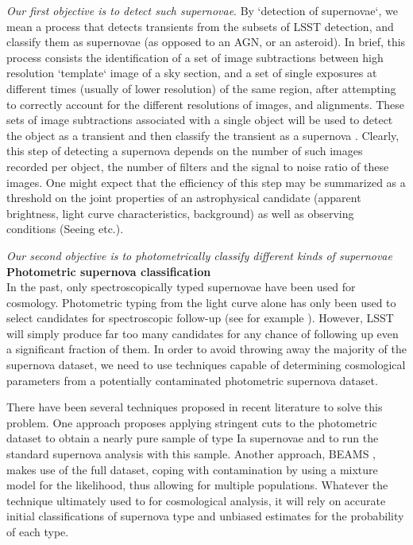 {\emph{Our first objective is to detect such supernovae}}. By `detection of supernovae`, we mean a process
that detects transients from the subsets of LSST detection, and classify them as supernovae (as opposed to an AGN, or an asteroid). In brief, this process 
consists the identification of a set of image subtractions between high 
resolution `template` image of a sky section, and a set of single exposures at
different times (usually of lower resolution) of the same region, after 
attempting to correctly account for the different resolutions of images, and alignments. These sets of image subtractions associated
 with a single object will be used to detect the object as a transient and then
classify the transient as a supernova . Clearly, this step of detecting a supernova depends on the number of such images recorded per object, the number of filters and the signal to noise ratio of these images. One might expect that the efficiency of this step may be summarized as a threshold on the joint properties 
of an astrophysical candidate (apparent brightness, light curve characteristics, background) as well as observing conditions (Seeing etc.).  

{\emph{Our second objective is to photometrically classify different kinds of supernovae}} 
{\bfseries Photometric supernova classification}\\
In the past, only spectroscopically typed supernovae have been used for cosmology. Photometric 
typing from the light curve alone has only been used to select candidates for spectroscopic 
follow-up (see for example \citet{Sako2008}). However, LSST will simply produce far too many 
candidates for any chance of following up even a significant fraction of them. In order to avoid 
throwing away the majority of the supernova dataset, we need to use techniques capable of 
determining cosmological parameters from a potentially contaminated photometric supernova dataset.

There have been several techniques proposed in recent literature to solve this problem. One 
approach proposes applying stringent cuts to the photometric dataset to obtain a nearly pure sample 
of type Ia supernovae \citep{Bernstein2012,Campbell2013} and to run the standard supernova analysis 
with this sample. Another approach, BEAMS \citep{Kunz2007,Newling2011,Hlozek2012,Knights2013}, 
makes use of the full dataset, coping with contamination by using a mixture model for the 
likelihood, thus allowing for multiple populations. Whatever the technique ultimately used to for 
cosmological analysis, it will rely on accurate initial classifications of supernova type and 
unbiased estimates for the probability of each type.

